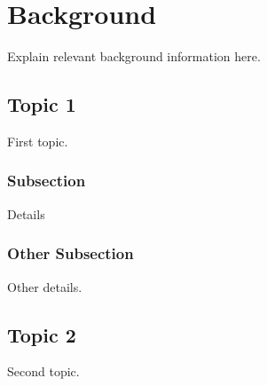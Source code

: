 \chapter{Background}\label{chap:background}

Explain relevant background information here.

\section{Topic 1}
First topic.

\subsection{Subsection}
Details

\subsection{Other Subsection}
Other details.

\section{Topic 2}
Second topic.
